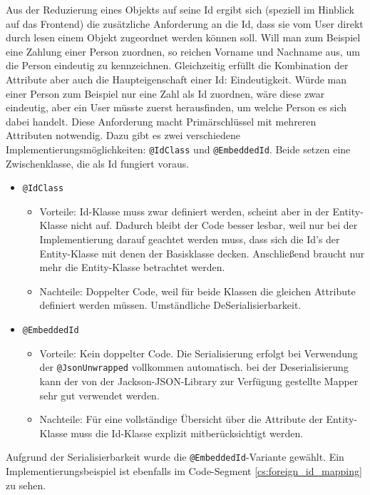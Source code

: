 
Aus der Reduzierung eines Objekts auf seine Id ergibt sich (speziell im Hinblick auf das Frontend) die zusätzliche Anforderung an die Id, dass sie vom User direkt durch lesen einem Objekt zugeordnet werden können soll. Will man zum Beispiel eine Zahlung einer Person zuordnen, so reichen Vorname und Nachname aus, um die Person eindeutig zu kennzeichnen. Gleichzeitig erfüllt die Kombination der Attribute aber auch die Haupteigenschaft einer Id: Eindeutigkeit. Würde man einer Person zum Beispiel nur eine Zahl als Id zuordnen, wäre diese zwar eindeutig, aber ein User müsste zuerst herausfinden, um welche Person es sich dabei handelt. Diese Anforderung macht Primärschlüssel mit mehreren Attributen notwendig. Dazu gibt es zwei verschiedene Implementierungsmöglichkeiten: \verb|@IdClass| und \verb|@EmbeddedId|. Beide setzen eine Zwischenklasse, die als Id fungiert voraus.

\begin{itemize}
	\item \verb|@IdClass|
	\begin{itemize}
		\item Vorteile: Id-Klasse muss zwar definiert werden, scheint aber in der Entity-Klasse nicht auf. Dadurch bleibt der Code besser lesbar, weil nur bei der Implementierung darauf geachtet werden muss, dass sich die Id's der Entity-Klasse mit denen der Basisklasse decken. Anschließend braucht nur mehr die Entity-Klasse betrachtet werden.
		\item Nachteile: Doppelter Code, weil für beide Klassen die gleichen Attribute definiert werden müssen. Umständliche DeSerialisierbarkeit.
	\end{itemize}	
	\item \verb|@EmbeddedId|
	\begin{itemize}
		\item Vorteile: Kein doppelter Code. Die Serialisierung erfolgt bei Verwendung der \verb|@JsonUnwrapped| vollkommen automatisch. bei der Deserialisierung kann der von der Jackson-JSON-Library zur Verfügung gestellte Mapper sehr gut verwendet werden. 
		\item Nachteile: Für eine vollständige Übersicht über die Attribute der Entity-Klasse muss die Id-Klasse explizit mitberücksichtigt werden.
	\end{itemize}
\end{itemize}

Aufgrund der Serialisierbarkeit wurde die \verb|@EmbeddedId|-Variante gewählt. Ein Implementierungsbeispiel ist ebenfalls im Code-Segment \ref{cs:foreign_id_mapping} zu sehen.

